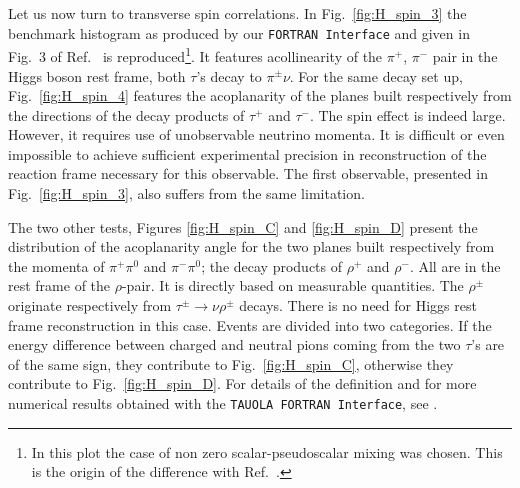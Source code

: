 \documentclass[]{Tauola_interface_design}
\begin{document}
Let us now turn  to transverse spin correlations. In Fig.~\ref{fig:H_spin_3}
the benchmark histogram as produced by our {\tt FORTRAN Interface} and given in Fig.~3 of 
Ref.~ \cite{Was:2002gv} is reproduced\footnote{  In this plot
the case of non zero scalar-pseudoscalar mixing was chosen. This is the origin of the difference with
Ref.~\cite{Was:2002gv}.}. 
It features acollinearity of the $\pi^+$, $\pi^-$ pair in
the Higgs boson rest frame, both $\tau$'s  decay to $\pi^\pm \nu$.
For the same decay set up, Fig.~\ref{fig:H_spin_4} features the acoplanarity of the planes built respectively from the directions of the decay products of $\tau^+$ and $\tau^-$. The spin effect is indeed large. However, it requires
use of unobservable neutrino momenta. It is difficult or even impossible 
to achieve sufficient experimental precision in reconstruction of the reaction frame necessary for this
observable. The first observable, presented in 
Fig.~\ref{fig:H_spin_3}, also suffers from the same limitation.

The two other tests, Figures \ref{fig:H_spin_C}  and \ref{fig:H_spin_D} present the distribution of the acoplanarity
angle for  the two planes built respectively from the momenta of $\pi^+\pi^0$ and 
$\pi^-\pi^0$; the decay products of $\rho^+$ and 
$\rho^-$. All are in the rest frame of the $\rho$-pair. It is directly based
on measurable quantities. The $\rho^\pm$  originate respectively 
from $\tau^\pm \to \nu \rho^\pm$ decays.
There is no need for Higgs rest frame reconstruction in this case. Events are divided
into two categories. If the energy difference between
charged and neutral pions coming from the two $\tau$'s are of the same sign, they
contribute to Fig.~\ref{fig:H_spin_C},
otherwise they contribute to  Fig.~\ref{fig:H_spin_D}. For details of the 
definition and for more numerical results obtained with the {\tt TAUOLA FORTRAN Interface}, 
see \cite{Desch:2003rw}.
\end{document}
